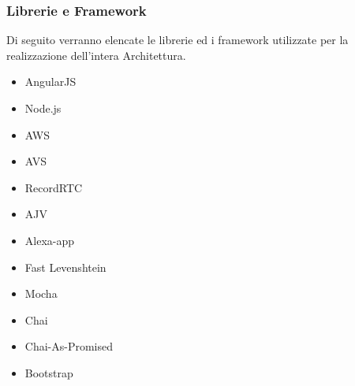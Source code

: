 \documentclass[../ManualeSviluppatore_v2.0.0.tex]{subfiles}
\begin{document}
		\subsubsection{Librerie e Framework}
			Di seguito verranno elencate le librerie ed i framework utilizzate per la realizzazione dell'intera Architettura.
			\begin{itemize}
				\item AngularJS
				\item Node.js
				\item AWS
				\item AVS
				\item RecordRTC
				\item AJV
				\item Alexa-app
				\item Fast Levenshtein
				\item Mocha
				\item Chai
				\item Chai-As-Promised
				\item Bootstrap
			\end{itemize}
\end{document}

